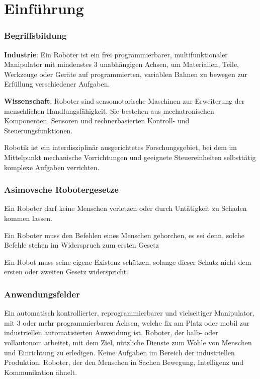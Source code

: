 \chapter{Einführung}

\subsection{Begriffsbildung}

\begin{compactitem}
    \item \textbf{Industrie}: Ein Roboter ist ein frei programmierbarer, multifunktionaler
    Manipulator mit mindenstes 3 unabhängigen Achsen, um Materialien, Teile, Werkzeuge oder
    Geräte auf programmierten, variablen Bahnen zu bewegen zur Erfüllung verschiedener Aufgaben.
    \item \textbf{Wissenschaft}: Roboter sind sensomotorische Maschinen zur Erweiterung der
    menschlichen Handlungsfähigkeit. Sie bestehen aus mechatronischen Komponenten, Sensoren und
    rechnerbasierten Kontroll- und Steuerungsfunktionen.
\end{compactitem}

Robotik ist ein interdisziplinär ausgerichtetes Forschungsgebiet, bei dem im Mittelpunkt mechanische
Vorrichtungen und geeignete Steuereinheiten selbsttätig komplexe Aufgaben verrichten.

\subsection{Asimovsche Robotergesetze}
\begin{compactenum}
    \item Ein Roboter darf keine Menschen verletzen oder durch Untätigkeit zu Schaden kommen lassen.
    \item Ein Roboter muss den Befehlen eines Menschen gehorchen, es sei denn, solche Befehle stehen
    im Widerspruch zum ersten Gesetz
    \item Ein Robot muss seine eigene Existenz schützen, solange dieser Schutz nicht dem ersten oder
    zweiten Gesetz widerspricht.
\end{compactenum}

\subsection{Anwendungsfelder}
Ein automatisch kontrollierter, reprogrammierbarer und vielseitiger Manipulator, mit 3 oder mehr
programmierbaren Achsen, welche fix am Platz oder mobil zur industriellen automatisierten
Anwendung ist.
Roboter, der halb- oder vollautonom arbeitet, mit dem Ziel, nützliche Dienste zum Wohle von Menschen
und Einrichtung zu erledigen. Keine Aufgaben im Bereich der industriellen Produktion.
Roboter, der den Menschen in Sachen Bewegung, Intelligenz und Kommunikation ähnelt.
